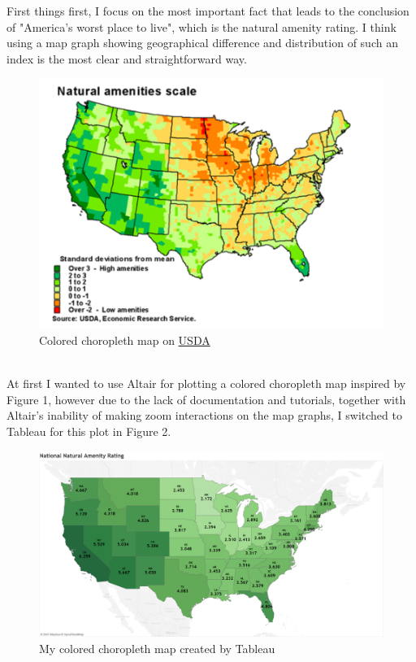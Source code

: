 \documentclass{article}
\begin{document}
First things first, I focus on the most important fact that leads to the conclusion of "America’s worst place to live", which is the natural amenity rating. I think using a map graph showing geographical difference and distribution of such an index is the most clear and straightforward way. \\
\begin{figure}[htbp]
    \centering
    \includegraphics[scale=0.6]{NA_ins.png}
    \caption{Colored choropleth map on \href{https://www.ers.usda.gov/data-products/natural-amenities-scale/}{USDA}}
\end{figure} \\
\noindent 
At first I wanted to use Altair for plotting a colored choropleth map inspired by Figure 1, however due to the lack of documentation and tutorials, together with Altair's inability of making zoom interactions on the map graphs, I switched to Tableau for this plot in Figure 2. \\
\begin{figure}[htbp]
    \centering
    \includegraphics[scale=0.4]{NA.png}
    \caption{My colored choropleth map created by Tableau}
\end{figure} \\
\end{document}
